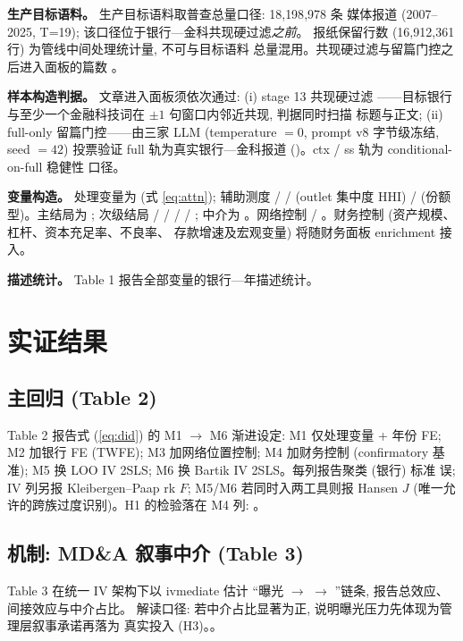 \textbf{生产目标语料。} 生产目标语料取普查总量口径: 18{,}198{,}978 条
媒体报道 (2007--2025, T=19); 该口径位于银行—金科共现硬过滤\emph{之前}。
报纸保留行数 (16{,}912{,}361 行) 为管线中间处理统计量, 不可与目标语料
总量混用。共现硬过滤与留篇门控之后进入面板的篇数
。

\textbf{样本构造判据。} 文章进入面板须依次通过: (i) stage 13 共现硬过滤
——目标银行与至少一个金融科技词在 $\pm 1$ 句窗口内邻近共现, 判据同时扫描
标题与正文; (ii) full-only 留篇门控——由三家 LLM (temperature $= 0$,
prompt v8 字节级冻结, seed $= 42$) 投票验证 full 轨为真实银行—金科报道
()。ctx / ss 轨为 conditional-on-full 稳健性
口径。

\textbf{变量构造。} 处理变量为  (式
\ref{eq:attn}); 辅助测度  /
 /  (outlet 集中度
HHI) /  (份额型)。主结局为
; 次级结局  /
 /  /
 / ; 中介为
。网络控制  /
。财务控制 (资产规模、杠杆、资本充足率、不良率、
存款增速及宏观变量) 将随财务面板 enrichment 接入。

\textbf{描述统计。} Table 1 报告全部变量的银行—年描述统计。

\section{实证结果}\label{sec:results}

\subsection{主回归 (Table 2)}
Table 2 报告式 (\ref{eq:did}) 的 M1 $\to$ M6 渐进设定: M1 仅处理变量 +
年份 FE; M2 加银行 FE (TWFE); M3 加网络位置控制; M4 加财务控制 (confirmatory
基准); M5 换 LOO IV 2SLS; M6 换 Bartik IV 2SLS。每列报告聚类 (银行) 标准
误; IV 列另报 Kleibergen--Paap rk $F$; M5/M6 若同时入两工具则报 Hansen $J$
(唯一允许的跨族过度识别)。H1 的检验落在 M4 列:
。

\subsection{机制: MD\&A 叙事中介 (Table 3)}
Table 3 在统一 IV 架构下以 ivmediate \parencite{dippel2020ivmediate} 估计
``曝光 $\to$  $\to$
''链条, 报告总效应、间接效应与中介占比。
解读口径: 若中介占比显著为正, 说明曝光压力先体现为管理层叙事承诺再落为
真实投入 (H3)。。

